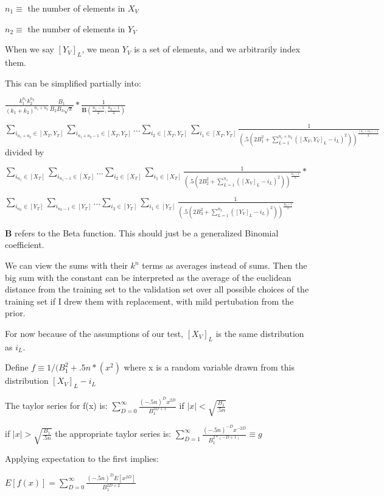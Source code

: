 \documentclass[11pt]{article}
\begin{document}
$n_1 \equiv $ the number of elements in $X_V$

$n_2 \equiv $ the number of elements in $Y_V$


When we say $[Y_V]_{L}$, we mean $Y_V$ is a set of elements, and we arbitrarily index them.

This can be simplified partially into:

$\frac{k_1^{n_1}k_2^{n_2}}{(k_1 + k_2)^{n_1+n_2}} \frac{B_1}{B_2 B_3 \sqrt{\pi}} * \frac{1}{ \mathbf{B}(\frac{n_1 -1}{2}, \frac{n_2 -1}{2})} $ 

$\sum_{i_{n_1+n_2} \in [X_T, Y_T]} \sum_{i_{n_1+n_2-1}\in [X_T, Y_T]} \ldots  \sum_{i_{2}\in [X_T, Y_T]} \sum_{i_{1}\in [X_T, Y_T]} \frac{1}{(.5(2B_1^2 +  \sum_{L=1}^{n_1+n_2} ([X_V, Y_V]_{L} - i_L)^2))^{\frac{(n_1+n_2)-1}{2}}} $ divided by 

$ \sum_{i_{n_1} \in [X_T]} \sum_{i_{n_1-1}\in [X_T]} \ldots  \sum_{i_{2}\in [X_T]} \sum_{i_{1}\in [X_T]} \frac{1}{(.5(2B_2^2 +  \sum_{L=1}^{{n_1}} ([X_V]_{L} - i_L)^2))^{\frac{{n_1}-1}{2}}}  * $

$ \sum_{i_{n_2} \in [Y_T]} \sum_{i_{n_2-1}\in [Y_T]} \ldots  \sum_{i_{2}\in [Y_T]} \sum_{i_{1}\in [Y_T]} \frac{1}{(.5(2B_3^2 +  \sum_{L=1}^{n_2} ([Y_V]_{L} - i_L)^2))^{\frac{n_2-1}{2}}} $

$\mathbf{B}$ refers to the Beta function. This should just be a generalized Binomial coefficient.

We can view the sums with their $k^n$ terms as averages instead of sums. Then the big sum with the constant can be interpreted as the average of the euclidean distance from the training set to the validation set over all possible choices of the training set if I drew them with replacement, with mild pertubation from the prior.

For now because of the assumptions of our test, $[X_V]_{L}$ is the same distribution as $i_L$.

Define $f \equiv 1 / (B_1^2 + .5n*(x^2)$ where x is a random variable drawn from this distribution $[X_V]_{L} - i_L$

The taylor series for f(x) is: $\sum_{D=0}^\infty \frac{(-.5n)^{D}x^{2D}}{B_1^{2D+1}}$ if $|x| < \sqrt{\frac{B_1}{.5n}} $

if $|x| > \sqrt{\frac{B_1}{.5n}}$ the appropriate taylor series is: $\sum_{D=1}^\infty \frac{(-.5n)^{-D}x^{-2D}}{B_1^{2*(-D+1)}} \equiv g$ 

Applying expectation to the first implies: 

$E[f(x)] = \sum_{D=0}^\infty \frac{(-.5n)^D E[x^{2D}]}{B_1^{2D+2}}$
\end{document}
